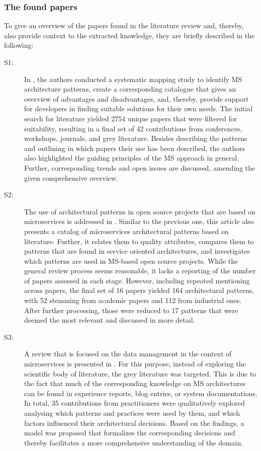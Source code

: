 \documentclass{bmcart}
\begin{document}
\subsubsection{The found papers}

To give an overview of the papers found in the literature review and, thereby, also provide context to the extracted knowledge, they are briefly described in the following:

\begin{description}
  \item[S1:] In \cite{Taibi.2018}, the authors conducted a systematic mapping study to identify MS architecture patterns, create a corresponding catalogue that gives an overview of advantages and disadvantages, and, thereby, provide support for developers in finding suitable solutions for their own needs. The initial search for literature yielded 2754 unique papers that were filtered for suitability, resulting in a final set of 42 contributions from conferences, workshops, journals, and grey literature. Besides describing the patterns and outlining in which papers their use has been described, the authors also highlighted the guiding principles of the MS approach in general. Further, corresponding trends and open issues are discussed, amending the given comprehensive overview.
  \item[S2:] The use of architectural patterns in open source projects that are based on microservices is addressed in \cite{Marquez.2018}. Similar to the previous one, this article also presents a catalog of microservices architectural patterns based on literature. Further, it relates them to quality attributes, compares them to patterns that are found in service oriented architectures, and investigates which patterns are used in MS-based open source projects. While the general review process seems reasonable, it lacks a reporting of the number of papers assessed in each stage. However, including repeated mentioning across papers, the final set of 16 papers yielded 164 architectural patterns, with 52 stemming from academic papers and 112 from industrial ones. After further processing, those were reduced to 17 patterns that were deemed the most relevant and discussed in more detail.
  \item[S3:] A review that is focused on the data management in the context of microservices is presented in \cite{Ntentos.2019}. For this purpose, instead of exploring the scientific body of literature, the grey literature was targeted. This is due to the fact that much of the corresponding knowledge on MS architectures can be found in experience reports, blog entries, or system documentations. In total, 35 contributions from practitioners were qualitatively explored analysing which patterns and practices were used by them, and which factors influenced their architectural decisions. Based on the findings, a model was proposed that formalizes the corresponding decisions and thereby facilitates a more comprehensive understanding of the domain.

\end{description}
\end{document}
